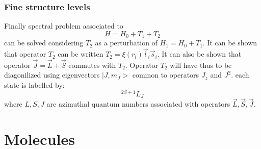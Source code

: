 \documentclass[12pt]{book}
\begin{document}
\subsubsection{Fine structure levels}
Finally spectral problem associated to
\begin{equation}
H=H_0+T_1+T_2
\end{equation}
can be solved considering $T_2$ as a perturbation of $H_1=H_0+T_1$.
It can be shown \cite{ph:atomi:Cagnac71} that operator $T_2$ can be written
$T_2=\xi(r_i)\vec l_i\vec s_i$. It can also be shown that operator $\vec
J=\vec L+\vec S$ commutes with $T_2$. Operator $T_2$ will have thus to be
diagonilized using eigenvectors $|J,m_J>$ common to operators $J_z$ and
$J^2$. each state is labelled by: 
\begin{equation}
^{2S+1}L_{J}
\end{equation}
where $L,S,J$ are azimuthal quantum numbers associated with operators $\vec
L,\vec S,\vec J$. 

\section{Molecules}\label{secmolecmq}
\end{document}
